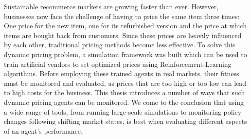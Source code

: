 Sustainable recommerce markets are growing faster than ever. However, businesses now face the challenge of having to price the same item three times: One price for the new item, one for its refurbished version and the price at which items are bought back from customers. Since these prices are heavily influenced by each other, traditional pricing methods become less effective. To solve this dynamic pricing problem, a simulation framework was built which can be used to train artificial vendors to set optimized prices using Reinforcement-Learning algorithms.
Before employing these trained agents in real markets, their fitness must be monitored and evaluated, as prices that are too high or too low can lead to high costs for the business. This thesis introduces a number of ways that such dynamic pricing agents can be monitored. We come to the conclusion that using a wide range of tools, from running large-scale simulations to monitoring policy changes following shifting market states, is best when evaluating different aspects of an agent's performance.